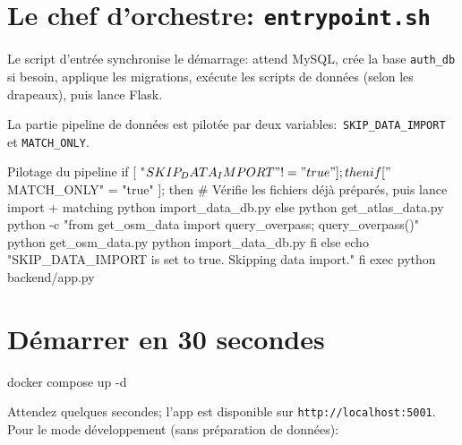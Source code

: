 \section{Le chef d'orchestre: \texttt{entrypoint.sh}}

Le script d'entrée synchronise le démarrage: attend MySQL, crée la base \texttt{auth\_db} si besoin, applique les migrations, exécute les scripts de données (selon les drapeaux), puis lance Flask.


\noindent La partie \og pipeline de données \fg{} est pilotée par deux variables:\ \texttt{SKIP\_DATA\_IMPORT} et \texttt{MATCH\_ONLY}.

\begin{codebox}[language=bash]{Pilotage du pipeline}
if [ "$SKIP_DATA_IMPORT" != "true" ]; then
  if [ "$MATCH_ONLY" = "true" ]; then
    # Vérifie les fichiers déjà préparés, puis lance import + matching
    python import_data_db.py
  else
    python get_atlas_data.py
    python -c "from get_osm_data import query_overpass; query_overpass()"
    python get_osm_data.py
    python import_data_db.py
  fi
else
  echo "SKIP_DATA_IMPORT is set to true. Skipping data import."
fi
exec python backend/app.py
\end{codebox}

\section{Démarrer en 30 secondes}

\begin{cmdbox}
docker compose up -d
\end{cmdbox}

\noindent Attendez quelques secondes; l'app est disponible sur \texttt{http://localhost:5001}. Pour le mode développement (sans préparation de données):


